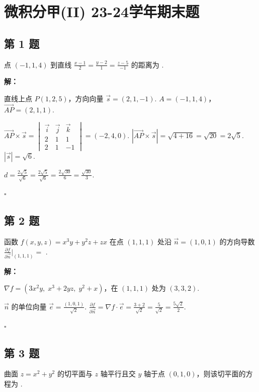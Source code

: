 \documentclass[12pt,a4paper]{article}
\newenvironment{sol}[1][解]{%
  \par\medskip\noindent\textbf{#1：}\itshape\par\noindent\ignorespaces
}{%
  \par\hfill$\square$\par\medskip
}
\begin{document}
\section*{微积分甲(II) 23-24学年期末题}

\subsection*{第 1 题}
点 $(-1,1,4)$ 到直线 $\frac{x-1}{2}=\frac{y-2}{1}=\frac{z-5}{-1}$ 的距离为
\underline{\qquad\qquad}.

\begin{sol}直线上点 $P(1,2,5)$，方向向量 $\vec{s}=(2,1,-1)$.
  $A=(-1,1,4)$，$\vec{AP}=(2,1,1)$.

  $\vec{AP}\times\vec{s}=
  \begin{vmatrix}\vec{i}&\vec{j}&\vec{k}\\2&1&1\\2&1&-1
  \end{vmatrix}=(-2,4,0)$.
  $|\vec{AP}\times\vec{s}|=\sqrt{4+16}=\sqrt{20}=2\sqrt{5}$.
  $|\vec{s}|=\sqrt{6}$.

  $d=\frac{2\sqrt{5}}{\sqrt{6}}=\frac{2\sqrt{5}}{\sqrt{6}}=\frac{2\sqrt{30}}{6}=\frac{\sqrt{30}}{3}.$

\end{sol}
\subsection*{第 2 题}
函数 $f(x,y,z)=x^3y+y^2z+zx$ 在点 $(1,1,1)$ 处沿 $\vec{n}=(1,0,1)$ 的方向导数
$\frac{\partial f}{\partial \vec{n}}|_{(1,1,1)}=$ \underline{\qquad\qquad}.

\begin{sol}$\nabla f=(3x^2y,\; x^3+2yz,\; y^2+x)$，在 $(1,1,1)$
  处为 $(3,3,2)$.

  $\vec{n}$ 的单位向量 $\vec{e}=\frac{(1,0,1)}{\sqrt{2}}$. $\frac{\partial
  f}{\partial\vec{n}}=\nabla
  f\cdot\vec{e}=\frac{3+2}{\sqrt{2}}=\frac{5}{\sqrt{2}}=\frac{5\sqrt{2}}{2}.$

\end{sol}
\subsection*{第 3 题}
曲面 $z=x^2+y^2$ 的切平面与 $z$ 轴平行且交 $y$ 轴于点 $(0,1,0)$，则该切平面的方程为
\underline{\qquad\qquad}.
\end{document}
